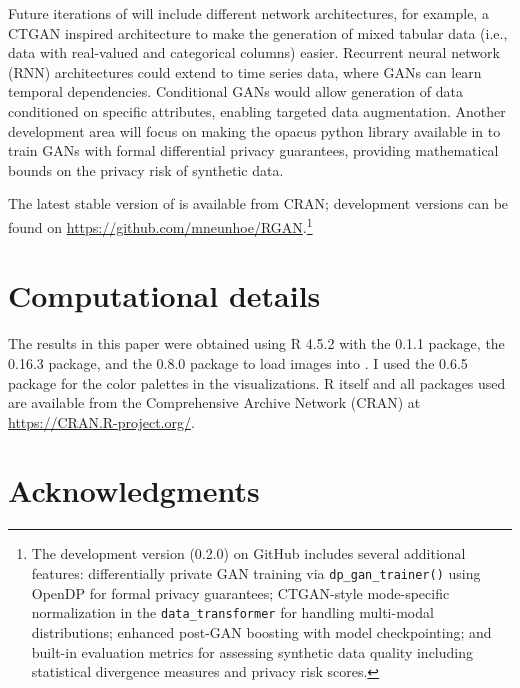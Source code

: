 Future iterations of  will include different network architectures, for example, a CTGAN \citep{Xu2019} inspired architecture to make the generation of mixed tabular data (i.e., data with real-valued and categorical columns) easier. Recurrent neural network (RNN) architectures could extend  to time series data, where GANs can learn temporal dependencies. Conditional GANs \citep{mirza2014conditional} would allow generation of data conditioned on specific attributes, enabling targeted data augmentation. Another development area will focus on making the opacus \citep{opacus} python library available in  to train GANs with formal differential privacy guarantees, providing mathematical bounds on the privacy risk of synthetic data.

The latest stable version of  is available from CRAN; development versions can be found on \url{https://github.com/mneunhoe/RGAN}.\footnote{The development version (0.2.0) on GitHub includes several additional features: differentially private GAN training via \texttt{dp\_gan\_trainer()} using OpenDP \citep{opendp} for formal privacy guarantees; CTGAN-style mode-specific normalization in the \texttt{data\_transformer} for handling multi-modal distributions; enhanced post-GAN boosting with model checkpointing; and built-in evaluation metrics for assessing synthetic data quality including statistical divergence measures and privacy risk scores.}

\section*{Computational details}\label{computational-details}

The results in this paper were obtained using R 4.5.2 with the  0.1.1 package, the  0.16.3 package, and the  0.8.0 \citep{torchvision} package to load images into . I used the  0.6.5 \citep{viridis} package for the color palettes in the visualizations. R itself and all packages used are available from the Comprehensive Archive Network (CRAN) at \url{https://CRAN.R-project.org/}.

\section*{Acknowledgments}\label{acknowledgments}

